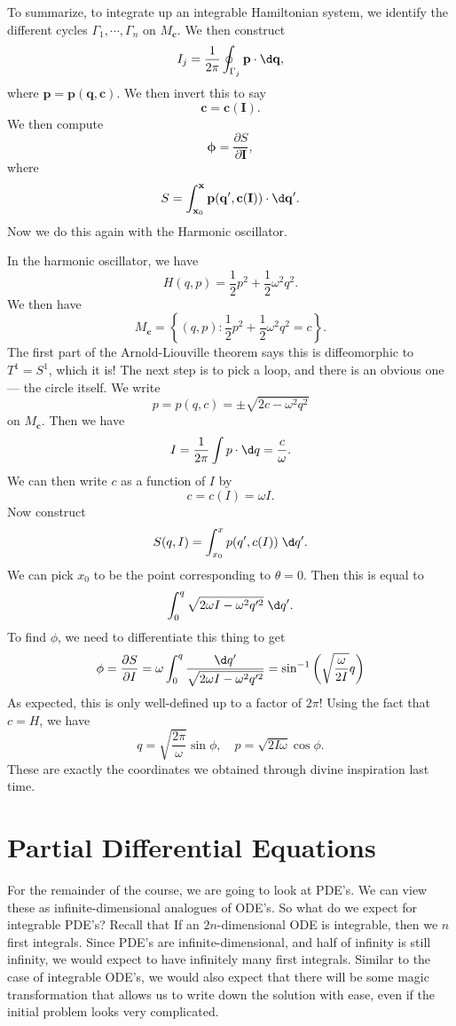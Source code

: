 \documentclass[a4paper]{article}
\begin{document}
To summarize, to integrate up an integrable Hamiltonian system, we identify the different cycles $\Gamma_1, \cdots, \Gamma_n$ on $M_\mathbf{c}$. We then construct
\[
  I_j = \frac{1}{2\pi} \oint_{\Gamma_j} \mathbf{p}\cdot \d \mathbf{q},
\]
where $\mathbf{p} = \mathbf{p}(\mathbf{q}, \mathbf{c})$. We then invert this to say
\[
  \mathbf{c} = \mathbf{c}(\mathbf{I}).
\]
We then compute
\[
  \boldsymbol\phi = \frac{\partial S}{\partial \mathbf{I}},
\]
where
\[
  S = \int_{\mathbf{x}_0}^{\mathbf{x}} \mathbf{p}(\mathbf{q}', \mathbf{c}(\mathbf{I})) \cdot \d \mathbf{q}'.
\]
Now we do this again with the Harmonic oscillator.
\begin{eg}
  In the harmonic oscillator, we have
  \[
    H(q, p) = \frac{1}{2}p^2 + \frac{1}{2}\omega^2 q^2.
  \]
  We then have
  \[
    M_\mathbf{c} = \left\{(q, p): \frac{1}{2} p^2 + \frac{1}{2}\omega^2 q^2 = c\right\}.
  \]
  The first part of the Arnold-Liouville theorem says this is diffeomorphic to $T^1 = S^1$, which it is! The next step is to pick a loop, and there is an obvious one --- the circle itself. We write
  \[
    p = p(q, c) = \pm \sqrt{2c - \omega^2 q^2}
  \]
  on $M_\mathbf{c}$. Then we have
  \[
    I = \frac{1}{2\pi} \int p \cdot \d q = \frac{c}{\omega}.
  \]
  We can then write $c$ as a function of $I$ by
  \[
    c = c(I) = \omega I.
  \]
  Now construct
  \[
    S(q, I) = \int_{x_0}^{x} p(q', c(I))\;\d q'.
  \]
  We can pick $x_0$ to be the point corresponding to $\theta = 0$. Then this is equal to
  \[
    \int_0^q \sqrt{2\omega I - \omega^2 q'^2} \;\d q'.
  \]
  To find $\phi$, we need to differentiate this thing to get
  \[
    \phi = \frac{\partial S}{\partial I} = \omega\int_0^q \frac{\d q'}{\sqrt{2 \omega I - \omega^2 q'^2}} = \sin^{-1}\left(\sqrt{\frac{\omega}{2I}}q\right)
  \]
  As expected, this is only well-defined up to a factor of $2\pi$! Using the fact that $c = H$, we have
  \[
    q = \sqrt{\frac{2\pi}{\omega}} \sin \phi,\quad p = \sqrt{2I\omega} \cos \phi.
  \]
  These are exactly the coordinates we obtained through divine inspiration last time.
\end{eg}
\section{Partial Differential Equations}
For the remainder of the course, we are going to look at PDE's. We can view these as infinite-dimensional analogues of ODE's. So what do we expect for integrable PDE's? Recall that If an $2n$-dimensional ODE is integrable, then we $n$ first integrals. Since PDE's are infinite-dimensional, and half of infinity is still infinity, we would expect to have infinitely many first integrals. Similar to the case of integrable ODE's, we would also expect that there will be some magic transformation that allows us to write down the solution with ease, even if the initial problem looks very complicated.
\end{document}
